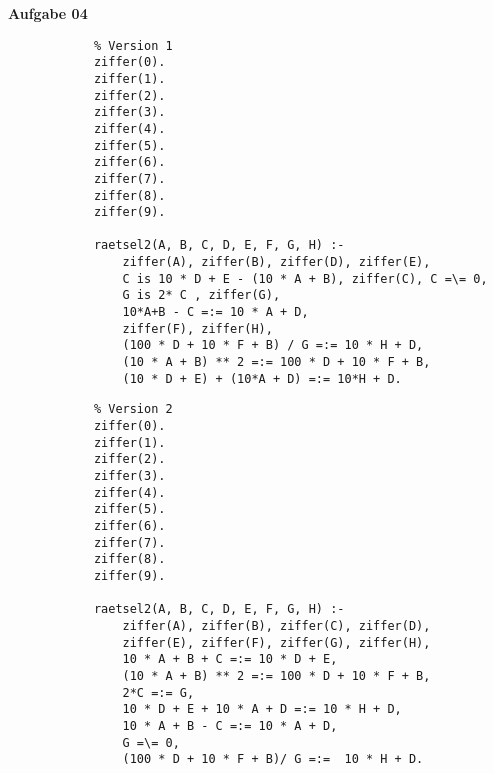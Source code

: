 \documentclass[a4paper,10pt]{article}
\begin{document}
	\newpage
	\textbf{Aufgabe 04}
	\begin{compactenum} [(a)]
		\item \begin{compactenum} [(V 1)]
			\item 
			\begin{verbatim}
			% Version 1
			ziffer(0).
			ziffer(1).
			ziffer(2).
			ziffer(3).
			ziffer(4).
			ziffer(5).
			ziffer(6).
			ziffer(7).
			ziffer(8).
			ziffer(9).
			
			raetsel2(A, B, C, D, E, F, G, H) :-
				ziffer(A), ziffer(B), ziffer(D), ziffer(E),
				C is 10 * D + E - (10 * A + B), ziffer(C), C =\= 0,
				G is 2* C , ziffer(G),
				10*A+B - C =:= 10 * A + D,
				ziffer(F), ziffer(H),
				(100 * D + 10 * F + B) / G =:= 10 * H + D,
				(10 * A + B) ** 2 =:= 100 * D + 10 * F + B,
				(10 * D + E) + (10*A + D) =:= 10*H + D.
			\end{verbatim}
			\item 
			\begin{verbatim}
			% Version 2
			ziffer(0).
			ziffer(1).
			ziffer(2).
			ziffer(3).
			ziffer(4).
			ziffer(5).
			ziffer(6).
			ziffer(7).
			ziffer(8).
			ziffer(9).
			
			raetsel2(A, B, C, D, E, F, G, H) :-
				ziffer(A), ziffer(B), ziffer(C), ziffer(D),
				ziffer(E), ziffer(F), ziffer(G), ziffer(H),
				10 * A + B + C =:= 10 * D + E,
				(10 * A + B) ** 2 =:= 100 * D + 10 * F + B,
				2*C =:= G,
				10 * D + E + 10 * A + D =:= 10 * H + D,
				10 * A + B - C =:= 10 * A + D,
				G =\= 0,
				(100 * D + 10 * F + B)/ G =:=  10 * H + D.
			\end{verbatim}
		\end{compactenum}\
		\item 
		\begin{verbatim}
		
		\end{verbatim}
	\end{compactenum}
\end{document}
